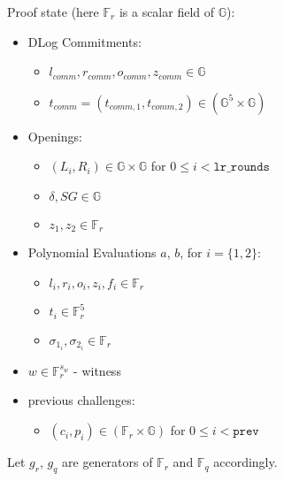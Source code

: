 Proof state (here $\mathbb{F}_r$ is a scalar field of $\mathbb{G}$):
\begin{itemize}
	\item DLog Commitments:
	\begin{itemize}
		\item $l_{comm}, r_{comm}, o_{comm}, z_{comm} \in \mathbb{G}$ %
		\item $t_{comm} = (t_{comm, 1}, t_{comm, 2}) \in (\mathbb{G}^5 \times \mathbb{G})$
	\end{itemize}
	\item Openings:
	\begin{itemize}
		\item $(L_i, R_i) \in \mathbb{G} \times \mathbb{G}$ for $0 \leq i < \texttt{lr\_rounds}$ %
		\item $\delta, SG \in \mathbb{G}$
		\item $z_1, z_2 \in \mathbb{F}_{r}$
	\end{itemize}
	\item Polynomial Evaluations $a$, $b$, for $i = \{1, 2\}$:
	\begin{itemize}
		\item $l_i, r_i, o_i, z_i, f_i \in \mathbb{F}_r$ %
		\item $t_i \in \mathbb{F}_r^5$
		\item $\sigma_{1_i}, \sigma_{2_i} \in \mathbb{F}_r$
	\end{itemize}
	\item $w \in \mathbb{F}_r^{s_w}$ - witness
	\item previous challenges:
	\begin{itemize}
		\item $(c_i, p_i) \in (\mathbb{F}_r \times \mathbb{G})$ for $0 \leq i < \texttt{prev}$
	\end{itemize}
\end{itemize}

Let $g_r$, $g_q$ are generators of $\mathbb{F}_r$ and $\mathbb{F}_q$ accordingly.

